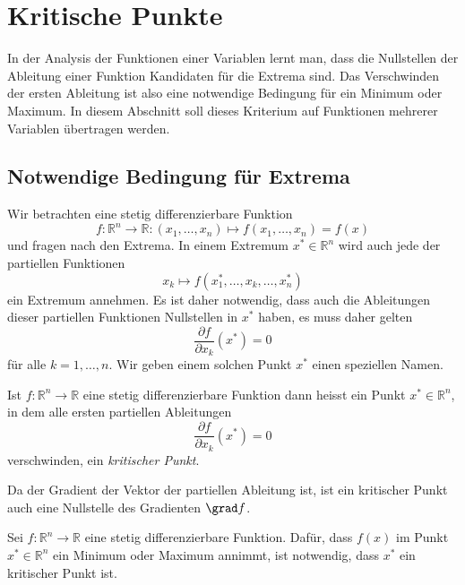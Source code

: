 %
%
%
\section{Kritische Punkte
\label{buch:fuvar:section:kritisch}}
In der Analysis der Funktionen einer Variablen lernt man, dass die
Nullstellen der Ableitung einer Funktion Kandidaten für die Extrema
sind.
Das Verschwinden der ersten Ableitung ist also eine notwendige Bedingung
für ein Minimum oder Maximum.
In diesem Abschnitt soll dieses Kriterium auf Funktionen mehrerer
Variablen übertragen werden.

%
%
\subsection{Notwendige Bedingung für Extrema}
Wir betrachten eine stetig differenzierbare Funktion 
\[
f
\colon
\mathbb{R}^n\to\mathbb{R}
:
(x_1,\dots,x_n) \mapsto f(x_1,\dots,x_n) = f(x)
\]
und fragen nach den Extrema.
In einem Extremum $x^*\in\mathbb{R}^n$ wird auch jede der partiellen
Funktionen
\[
x_k \mapsto f(x_1^*,\dots,x_k,\dots,x_n^*)
\]
ein Extremum annehmen.
Es ist daher notwendig, dass auch die Ableitungen dieser partiellen
Funktionen Nullstellen in $x^*$ haben, es muss daher gelten
\begin{equation*}
\frac{\partial f}{\partial x_k}(x^*) = 0
\end{equation*}
für alle $k=1,\dots,n$.
Wir geben einem solchen Punkt $x^*$ einen speziellen Namen.

\begin{definition}
Ist $f\colon \mathbb{R}^n\to\mathbb{R}$ eine stetig differenzierbare
Funktion dann heisst ein Punkt $x^*\in\mathbb{R}^n$, in dem alle
ersten partiellen Ableitungen
\begin{equation}
\frac{\partial f}{\partial x_k}(x^*) = 0
\end{equation}
verschwinden, ein {\em kritischer Punkt}.
\end{definition}

Da der Gradient der Vektor der partiellen Ableitung ist, ist ein
kritischer Punkt auch eine Nullstelle des Gradienten $\grad f$.

\begin{satz}
Sei $f\colon\mathbb{R}^n\to\mathbb{R}$ eine stetig differenzierbare
Funktion.
Dafür, dass $f(x)$ im Punkt $x^*\in\mathbb{R}^n$ ein Minimum oder Maximum
annimmt, ist notwendig, dass $x^*$ ein kritischer Punkt ist.
\end{satz}

